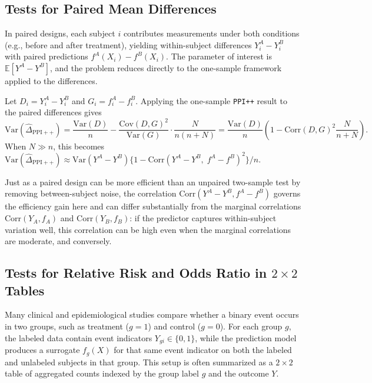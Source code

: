 \documentclass[12pt]{article}
\newcommand{\E}{\mathbb{E}}
\newcommand{\Var}{\mathrm{Var}}
\newcommand{\Cov}{\mathrm{Cov}}
\newcommand{\Corr}{\mathrm{Corr}}
\newcommand{\wh}{\widehat}
\begin{document}
\subsection{Tests for Paired Mean Differences}
\label{sec:paired}

In paired designs, each subject $i$ contributes measurements under both
conditions (e.g., before and after treatment), yielding within-subject
differences $Y_i^A - Y_i^B$ with paired predictions $f^A(X_i) - f^B(X_i)$.
The parameter of interest is $\E[Y^A - Y^B]$, and the problem reduces
directly to the one-sample framework applied to the differences.

\begin{proposition}\label{prop:paired-var}
Let $D_i = Y_i^A - Y_i^B$ and $G_i = f_i^A - f_i^B$. Applying the
one-sample \texttt{PPI++} result to the paired differences gives
\[
\Var(\wh{\Delta}_{\mathrm{PPI++}})
=
\frac{\Var(D)}{n}
-
\frac{\Cov(D,G)^2}{\Var(G)}
\cdot
\frac{N}{n(n+N)}
=
\frac{\Var(D)}{n}
\left(
1-\Corr(D,G)^2\frac{N}{n+N}
\right).
\]
When $N \gg n$, this becomes
$\Var(\wh{\Delta}_{\mathrm{PPI++}})
\approx \Var(Y^A-Y^B)\{1-\Corr(Y^A-Y^B,\;f^A-f^B)^2\}/n$.
\end{proposition}

Just as a paired design can be more efficient than an unpaired two-sample test
by removing between-subject noise, the correlation $\Corr(Y^A - Y^B, f^A -
f^B)$ governs the efficiency gain here and can differ substantially from the
marginal correlations $\Corr(Y_A, f_A)$ and $\Corr(Y_B, f_B)$: if the
predictor captures within-subject variation well, this correlation can be high
even when the marginal correlations are moderate, and conversely.

\subsection{Tests for Relative Risk and Odds Ratio in $2\times2$ Tables}
\label{sec:2x2}

Many clinical and epidemiological studies compare whether a binary event occurs
in two groups, such as treatment ($g=1$) and control ($g=0$). For each group
$g$, the labeled data contain event indicators $Y_{gi} \in \{0,1\}$, while the
prediction model produces a surrogate $f_g(X)$ for that same event indicator on
both the labeled and unlabeled subjects in that group. This setup is often summarized as a $2\times2$ table of aggregated counts indexed by the group label $g$ and the outcome $Y$.
\end{document}
